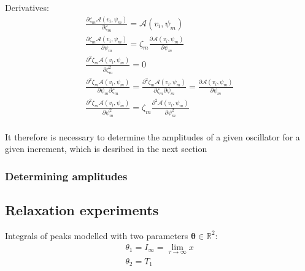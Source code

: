 Derivatives:
\begin{subequations}
    \begin{gather}
        \frac{\partial \zeta_m \mathcal{A} \left(v_i, \psi_m\right)}
            {\partial \zeta_m} =
            \mathcal{A}\left(v_i, \psi_m\right) \\
        \frac{\partial \zeta_m \mathcal{A} \left(v_i, \psi_m\right)}
            {\partial \psi_m} =
            \zeta_m \frac{\partial\mathcal{A}\left(v_i, \psi_m\right)}{\partial \psi_m}\\
        \frac{\partial^2 \zeta_m \mathcal{A} \left(v_i, \psi_m\right)}
            {\partial \zeta_m^2} = 0\\
        \frac{\partial^2 \zeta_m \mathcal{A} \left(v_i, \psi_m\right)}
            {\partial \psi_m \partial \zeta_m} =
            \frac{\partial^2 \zeta_m \mathcal{A} \left(v_i, \psi_m\right)}
            {\partial \zeta_m \partial \psi_m} =
            \frac{\partial\mathcal{A}\left(v_i, \psi_m\right)}{\partial \psi_m}\\
        \frac{\partial^2 \zeta_m \mathcal{A} \left(v_i, \psi_m\right)}
            {\partial \psi_m^2} =
            \zeta_m \frac{\partial^2 \mathcal{A}\left(v_i, \psi_m\right)}{\partial \psi_m^2}\\
    \end{gather}
\end{subequations}

It therefore is necessary to determine the amplitudes of a given oscillator for a given increment, which is desribed in the next section

\subsubsection{Determining amplitudes}


\subsection{Relaxation experiments}
\label{sec:relaxation_experiments}

Integrals of peaks modelled with two parameters $\symbf{\theta} \in \mathbb{R}^2$:
\begin{subequations}
   \begin{gather}
        \theta_1 = I_{\infty} = \lim_{\tau \rightarrow \infty} x\\
        \theta_2 = T_1
   \end{gather}
\end{subequations}

